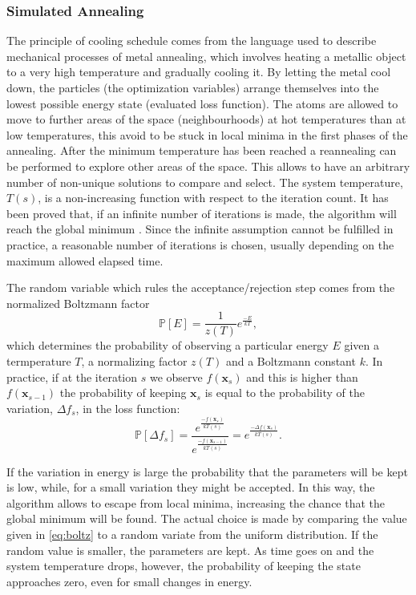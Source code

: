 \subsubsection{Simulated Annealing}

The principle of cooling schedule comes from the language used to describe mechanical processes of metal annealing, which involves heating a metallic object to a very high temperature and gradually cooling it. By letting the metal cool down, the particles (the optimization variables) arrange themselves into the lowest possible energy state (evaluated loss function). The atoms are allowed to move to further areas of the space (neighbourhoods) at hot temperatures than at low temperatures, this avoid to be stuck in local minima in the first phases of the annealing. After the minimum temperature has been reached a reannealing can be performed to explore other areas of the space. This allows to have an arbitrary number of non-unique solutions to compare and select. The system temperature, $T(s)$, is a non-increasing function with respect to the iteration count. It has been proved that, if an infinite number of iterations is made, the algorithm will reach the global minimum \parencite{belisle1992}. Since the infinite assumption cannot be fulfilled in practice, a reasonable number of iterations is chosen, usually depending on the maximum allowed elapsed time.

The random variable which rules the acceptance/rejection step comes from the normalized Boltzmann factor
\begin{equation}
\mathbb{P}\left[E\right]=\frac{1}{z(T)}e^{\frac{-E}{kT}},
\end{equation} 
\noindent which determines the probability of observing a particular energy $E$ given a termperature $T$, a normalizing factor $z(T)$ and a Boltzmann constant $k$. In practice, if at the iteration $s$ we observe $f(\mathbf{x}_s)$ and this is higher than $f(\mathbf{x}_{s-1})$ the probability of keeping $\mathbf{x}_s$ is equal to the probability of the variation, $\Delta f_s$, in the loss function:
\vspace{10px}
\begin{equation}\label{eq:boltz}
\mathbb{P}\left[\Delta f_s\right]=\frac{e^{\frac{-f(\mathbf{x}_s)}{kT(s)}}}{e^{\frac{-f(\mathbf{x}_{s-1})}{kT(s)}}}= e^{\frac{-\Delta f(\mathbf{x}_s)}{kT(s)}}.
\end{equation}

If the variation in energy is large the probability that the parameters will be kept is low, while, for a small variation they might be accepted. In this way, the algorithm allows to escape from local minima, increasing the chance that the global minimum will be found. The actual choice is made by comparing the value given in \eqref{eq:boltz} to a random variate from the uniform distribution. If the random value is smaller, the parameters are kept. As time goes on and the system temperature drops, however, the probability of keeping the state approaches zero, even for small changes in energy.

